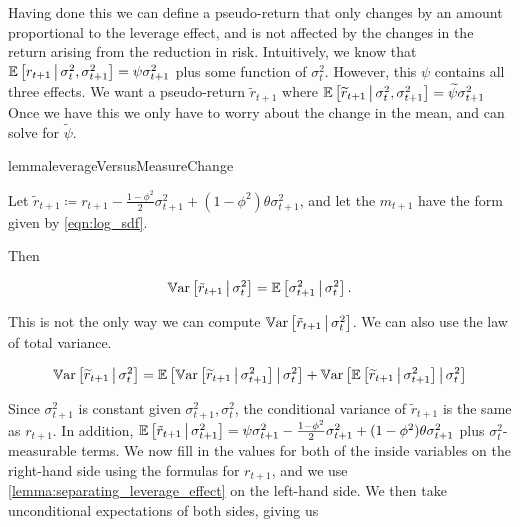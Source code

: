 \documentclass[11pt, letterpaper, twoside, final]{article}
\begin{document}
Having done this we can define a pseudo-return that only changes by an amount proportional to the leverage
effect, and is not affected by the changes in the return arising from the reduction in risk.
Intuitively, we know that $\operatorname{\mathbb{E}}\left[r_{t+1} \,\middle\vert\, \sigma^2_t, \sigma^2_{t+1} \right] = \psi \sigma^2_{t+1}$
plus some function  of $\sigma^2_t$.
However, this $\psi$ contains all three effects.
We want a pseudo-return $\widetilde{r}_{t+1}$ where $\operatorname{\mathbb{E}}\left[\widetilde{r}_{t+1} \,\middle\vert\, \sigma^2_t,
\sigma^2_{t+1} \right] = \widetilde{\psi} \sigma^2_{t+1}$
Once we have this we only have to worry about the change in the mean, and can solve for $\tilde{\psi}$.

\begin{restatable}{lemma}{leverageVersusMeasureChange}
    \label{lemma:separating_leverage_effect}

    Let $\tilde{r}_{t+1} \coloneqq r_{t+1} - \frac{1 - \phi^2}{2} \sigma^2_{t+1} + (1 - \phi^2) \theta
    \sigma^2_{t+1}$, and let the $m_{t+1}$ have the form given by \cref{eqn:log_sdf}.
    
    Then 
    
    \begin{equation}
        \operatorname{\mathbb{V}ar}\left[\tilde{r}_{t+1} \,\middle\vert\, \sigma^2_t \right] = \operatorname{\mathbb{E}}\left[\sigma^2_{t+1} \,\middle\vert\, \sigma^2_t\right].
    \end{equation}
\end{restatable}

This is not the only way we can compute $\operatorname{\mathbb{V}ar}\left[\tilde{r}_{t+1} \,\middle\vert\, \sigma^2_t \right]$.
We can also use the law of total variance.

\begin{equation}
    \operatorname{\mathbb{V}ar}\left[\widetilde{r}_{t+1} \,\middle\vert\, \sigma^2_t\right]  =
    \operatorname{\mathbb{E}}\left[\operatorname{\mathbb{V}ar}\left[\widetilde{r}_{t+1} \,\middle\vert\, \sigma^2_{t+1}\right] \,\middle\vert\, \sigma_t^2 \right] +
    \operatorname{\mathbb{V}ar}\left[\operatorname{\mathbb{E}}\left[\widetilde{r}_{t+1}\,\middle\vert\, \sigma_{t+1}^2\right] \,\middle\vert\, \sigma^2_t\right]
\end{equation}

Since $\sigma^2_{t+1}$ is constant given $\sigma^2_{t+1}, \sigma^2_t$, the conditional variance of
$\widetilde{r}_{t+1}$ is the same as $r_{t+1}$.
In addition, $\operatorname{\mathbb{E}}\left[\tilde{r}_{t+1} \,\middle\vert\, \sigma^2_{t+1}\right]  = \psi \sigma^2_{t+1} - \frac{1-\phi^2}{2}
\sigma^2_{t+1} + (1- \phi^2) \theta \sigma^2_{t+1}$ plus $\sigma^2_t$-measurable terms.
We now fill in the values for both of the inside variables on the right-hand side using the formulas for
$r_{t+1}$, and we use \cref{lemma:separating_leverage_effect} on the left-hand side. 
We then take unconditional expectations of both sides, giving  us
\end{document}
